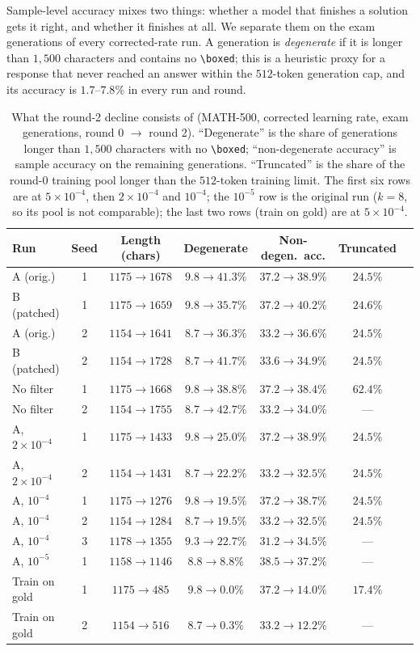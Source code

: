 \documentclass[runningheads]{llncs}
\begin{document}
Sample-level accuracy mixes two things: whether a model that finishes a solution
gets it right, and whether it finishes at all. We separate them on the exam
generations of every corrected-rate run. A generation is \emph{degenerate} if it
is longer than $1{,}500$ characters and contains no \verb|\boxed|; this is a
heuristic proxy for a response that never reached an answer within the $512$-token
generation cap, and its accuracy is $1.7$--$7.8\%$ in every run and round.

\begin{table}[t]
\caption{What the round-2 decline consists of (MATH-500, corrected learning
rate, exam generations, round 0 $\to$ round 2). ``Degenerate'' is the share
of generations longer than $1{,}500$ characters with no
\texttt{\textbackslash boxed}; ``non-degenerate accuracy'' is sample accuracy
on the remaining generations. ``Truncated'' is the share of the round-0
training pool longer than the $512$-token training limit. The first six rows
are at $5\times10^{-4}$, then $2\times10^{-4}$ and $10^{-4}$; the $10^{-5}$ row is
the original run ($k=8$, so its pool is not comparable); the last two rows
(train on gold) are at $5\times10^{-4}$.}
\label{tab:anatomy}
\centering
\setlength{\tabcolsep}{4pt}
\begin{tabular}{lcccccc}
\toprule
Run & Seed & Length (chars) & Degenerate & Non-degen.\ acc. & Truncated \\
\midrule
A (orig.)     & 1 & $1175\to1678$ & $9.8\to41.3\%$ & $37.2\to38.9\%$ & $24.5\%$ \\
B (patched)   & 1 & $1175\to1659$ & $9.8\to35.7\%$ & $37.2\to40.2\%$ & $24.6\%$ \\
A (orig.)     & 2 & $1154\to1641$ & $8.7\to36.3\%$ & $33.2\to36.6\%$ & $24.5\%$ \\
B (patched)   & 2 & $1154\to1728$ & $8.7\to41.7\%$ & $33.6\to34.9\%$ & $24.5\%$ \\
No filter     & 1 & $1175\to1668$ & $9.8\to38.8\%$ & $37.2\to38.4\%$ & $62.4\%$ \\
No filter     & 2 & $1154\to1755$ & $8.7\to42.7\%$ & $33.2\to34.0\%$ & --- \\
A, $2\times10^{-4}$ & 1 & $1175\to1433$ & $9.8\to25.0\%$ & $37.2\to38.9\%$ & $24.5\%$ \\
A, $2\times10^{-4}$ & 2 & $1154\to1431$ & $8.7\to22.2\%$ & $33.2\to32.5\%$ & $24.5\%$ \\
A, $10^{-4}$  & 1 & $1175\to1276$ & $9.8\to19.5\%$ & $37.2\to38.7\%$ & $24.5\%$ \\
A, $10^{-4}$  & 2 & $1154\to1284$ & $8.7\to19.5\%$ & $33.2\to32.5\%$ & $24.5\%$ \\
A, $10^{-4}$  & 3 & $1178\to1355$ & $9.3\to22.7\%$ & $31.2\to34.5\%$ & --- \\
A, $10^{-5}$  & 1 & $1158\to1146$ & $8.8\to8.8\%$  & $38.5\to37.2\%$ & --- \\
Train on gold & 1 & $1175\to485$  & $9.8\to0.0\%$  & $37.2\to14.0\%$ & $17.4\%$ \\
Train on gold & 2 & $1154\to516$  & $8.7\to0.3\%$  & $33.2\to12.2\%$ & --- \\
\bottomrule
\end{tabular}
\end{table}
\end{document}
